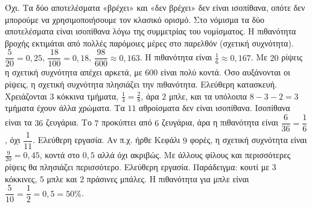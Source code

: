  Όχι. Τα δύο αποτελέσματα «βρέχει» και «δεν βρέχει» δεν είναι ισοπίθανα, οπότε δεν μπορούμε να χρησιμοποιήσουμε τον κλασικό ορισμό. Στο νόμισμα τα δύο αποτελέσματα είναι ισοπίθανα λόγω της συμμετρίας του νομίσματος. Η πιθανότητα βροχής εκτιμάται από πολλές παρόμοιες μέρες στο παρελθόν (σχετική συχνότητα).
 $\dfrac{5}{20}=0{,}25$, $\dfrac{18}{100}=0{,}18$, $\dfrac{98}{600}\approx0{,}163$. Η πιθανότητα είναι $\frac{1}{6}\approx0{,}167$. Με $20$ ρίψεις η σχετική συχνότητα απέχει αρκετά, με $600$ είναι πολύ κοντά. Όσο αυξάνονται οι ρίψεις, η σχετική συχνότητα πλησιάζει την πιθανότητα.
 Ελεύθερη κατασκευή. Χρειάζονται $3$ κόκκινα τμήματα, $\frac{1}{4}=\frac{2}{8}$, άρα $2$ μπλε, και τα υπόλοιπα $8-3-2=3$ τμήματα έχουν άλλα χρώματα.
 Τα $11$ αθροίσματα δεν είναι ισοπίθανα. Ισοπίθανα είναι τα $36$ ζευγάρια. Το $7$ προκύπτει από $6$ ζευγάρια, άρα η πιθανότητα είναι $\dfrac{6}{36}=\dfrac{1}{6}$, όχι $\dfrac{1}{11}$.
 Ελεύθερη εργασία. Αν π.χ. ήρθε Κεφάλι $9$ φορές, η σχετική συχνότητα είναι $\frac{9}{20}=0{,}45$, κοντά στο $0{,}5$ αλλά όχι ακριβώς. Με άλλους φίλους και περισσότερες ρίψεις θα πλησιάζει περισσότερο.
 Ελεύθερη εργασία. Παράδειγμα: κουτί με $3$ κόκκινες, $5$ μπλε και $2$ πράσινες μπάλες. Η πιθανότητα για μπλε είναι $\dfrac{5}{10}=\dfrac{1}{2}=0{,}5=50\%$.
